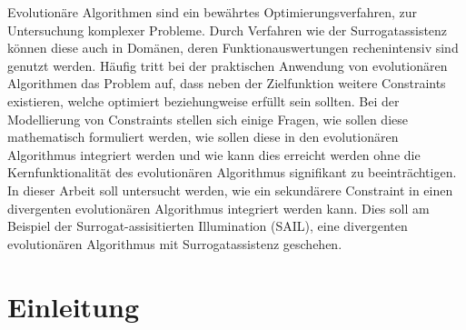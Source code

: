 Evolutionäre Algorithmen sind ein bewährtes Optimierungsverfahren, zur Untersuchung komplexer Probleme.
Durch Verfahren wie der Surrogatassistenz können diese auch in Domänen, deren Funktionauswertungen rechenintensiv sind genutzt werden.
Häufig tritt bei der praktischen Anwendung von evolutionären Algorithmen das Problem auf, dass neben der Zielfunktion weitere Constraints existieren, welche optimiert beziehungweise erfüllt sein sollten.
Bei der Modellierung von Constraints stellen sich einige Fragen, wie sollen diese mathematisch formuliert werden, wie sollen diese in den evolutionären Algorithmus integriert werden und wie kann dies erreicht werden ohne die Kernfunktionalität des evolutionären Algorithmus signifikant zu beeinträchtigen.
In dieser Arbeit soll untersucht werden, wie ein sekundärere Constraint in einen divergenten evolutionären Algorithmus integriert werden kann.
Dies soll am Beispiel der Surrogat-assisitierten Illumination (SAIL), eine divergenten evolutionären Algorithmus mit Surrogatassistenz geschehen.

\section{Einleitung}

